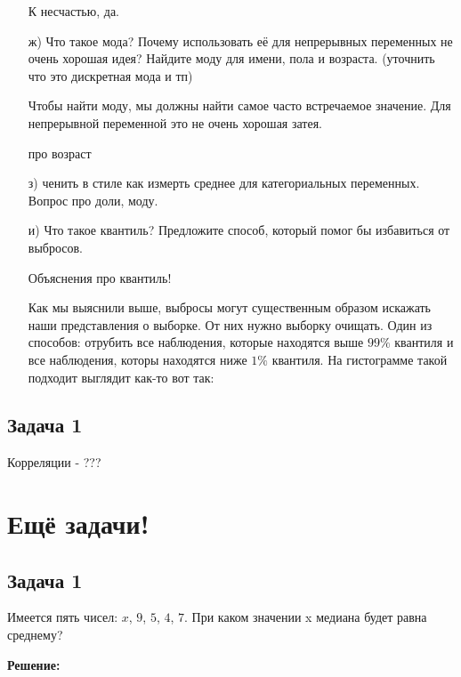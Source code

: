 \documentclass[12pt, a4paper, oneside]{article}
\begin{document}
\begin{enumerate}
К несчастью, да. 

\item[ж)] Что такое мода? Почему использовать её для непрерывных переменных не очень хорошая идея? Найдите моду для имени, пола и возраста.  (уточнить что это дискретная мода и тп) 

Чтобы найти моду, мы должны найти самое часто встречаемое значение. Для непрерывной переменной это не очень хорошая затея. 

про возраст 


\item[з)]  ченить в стиле как измерть среднее для категориальных переменных. Вопрос про доли, моду. 

\item[и)]  Что такое квантиль? Предложите способ, который помог бы избавиться от выбросов. 	

Объяснения про квантиль! 

Как мы выяснили выше, выбросы могут существенным образом искажать наши представления о выборке. От них нужно выборку очищать. Один из способов: отрубить все наблюдения, которые находятся выше $99\%$ квантиля и все наблюдения, которы находятся ниже $1\%$ квантиля. На гистограмме такой подходит выглядит как-то вот так: 


\end{enumerate}





\subsection*{Задача 1}

Корреляции - ??? 





\section*{Ещё задачи!} 

\subsection*{Задача 1}

Имеется пять чисел: $x$, $9$, $5$, $4$, $7$. При каком значении x медиана будет равна среднему?
 
 \textbf{Решение:} 
 
\end{document}
